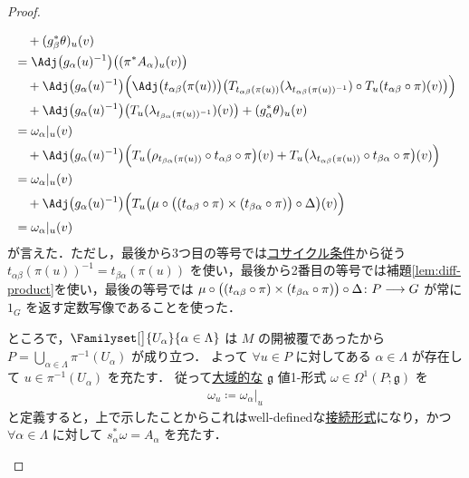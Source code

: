 \documentclass[geometry_main]{subfiles}
\begin{document}
\begin{proof}
\begin{enumerate}
\begin{description}
\begin{align}
                &\quad + (g_\beta^* \theta)_u(v) \\
                &= \Adj \bigl( g_\alpha(u)^{-1} \bigr) \bigl( (\pi^* A_\alpha)_u (v) \bigr) \\
                &\quad + \Adj \bigl(g_\alpha(u)^{-1}\bigr) \Bigl( \Adj \bigl( t_{\alpha\beta}(\pi(u)) \bigr)\bigl( T_{t_{\alpha\beta}(\pi(u))} (\lambda_{t_{\alpha\beta}(\pi(u))^{-1}}) \circ T_u (t_{\alpha\beta}\circ \pi) (v) \bigr) \Bigr) \\
                &\quad + \Adj \bigl(g_\alpha(u)^{-1}\bigr) \bigl( T_u(\lambda_{t_{\beta\alpha}(\pi(u))^{-1}})(v) \bigr) + (g_\alpha^* \theta)_u (v) \\
                &= \omega_\alpha|_u (v) \\
                &\quad + \Adj \bigl(g_\alpha(u)^{-1}\bigr) \Bigl( T_u \bigl( \rho_{t_{\beta\alpha}(\pi(u))} \circ t_{\alpha\beta} \circ \pi \bigr)(v) + T_u \bigl( \lambda_{t_{\alpha\beta}(\pi(u))} \circ t_{\beta\alpha} \circ \pi \bigr)(v)  \Bigr) \\
                &= \omega_\alpha|_u(v) \\
                &\quad + \Adj \bigl(g_\alpha(u)^{-1}\bigr) \Bigl( T_u \bigl( \mu \circ \bigl( (t_{\alpha\beta} \circ \pi) \times (t_{\beta\alpha} \circ \pi) \bigr) \circ \Delta \bigr)(v) \Bigr) \\
                &= \omega_\alpha|_u(v)
            \end{align}
            が言えた．ただし，最後から3つ目の等号では\hyperref[eq.cocycle]{コサイクル条件}から従う $t_{\alpha\beta}(\pi(u))^{-1} = t_{\beta\alpha}(\pi(u))$ を使い，最後から2番目の等号では補題\ref{lem:diff-product}を使い，最後の等号では $\mu \circ \bigl( (t_{\alpha\beta} \circ \pi) \times (t_{\beta\alpha} \circ \pi) \bigr) \circ \Delta \colon P \longrightarrow G$ が常に $1_G$ を返す定数写像であることを使った．
            
        \end{description}
        ところで，$\Familyset[\big]{U_\alpha}{\alpha \in \Lambda}$ は $M$ の開被覆であったから $P = \bigcup_{\alpha \in \Lambda} \pi^{-1}(U_\alpha)$ が成り立つ．
        よって $\forall u \in P$ に対してある $\alpha \in \Lambda$ が存在して $u \in \pi^{-1}(U_\alpha)$ を充たす．
        従って\underline{大域的な} $\mathfrak{g}$ 値1-形式 $\omega \in \Omega^1(P; \mathfrak{g})$ を
        \begin{align}
            \omega_u \coloneqq \omega_\alpha|_u
        \end{align}
        と定義すると，上で示したことからこれはwell-definedな\hyperref[def:connection]{接続形式}になり，かつ $\forall \alpha \in \Lambda$ に対して $s_\alpha^* \omega = A_\alpha$ を充たす．


\end{enumerate}
\end{proof}
\end{document}
